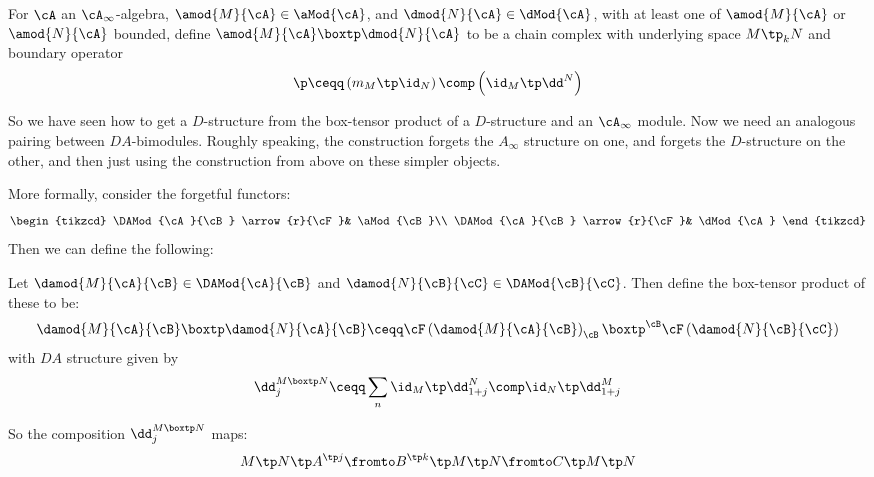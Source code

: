 \documentclass{amsproc}
\begin{document}

\begin{defn}
For $\cA$ an $\cA_\infty$-algebra, $\amod{M}{\cA} \in \aMod{\cA}$, 
and $\dmod{N}{\cA}\in \dMod{\cA}$, with at least one of $\amod{M}{\cA}$ or $\amod{N}{\cA}$
bounded, define $\amod{M}{\cA} \boxtp \dmod{N}{\cA}$ 
to be a chain complex with underlying space
$M\tp_k N$ and boundary operator
\begin{equation}
\p \ceqq \left( m_M \tp \id_N \right)\comp \left( \id_M \tp \dd^N \right)
\end{equation}
\end{defn}

So we have seen how to get a $D$-structure from the box-tensor
product of a $D$-structure and an $\cA_\infty$ module. 
Now we need an analogous pairing between $DA$-bimodules. 
Roughly speaking, the construction forgets the $A_\infty$ structure on one,
and forgets the $D$-structure on the other, and then just using the construction
from above on these simpler objects. 

More formally, consider the forgetful functors:
\begin{equation}
\begin{tikzcd}
\DAMod{\cA}{\cB} \arrow{r}{\cF}& \aMod{\cB}\\
\DAMod{\cA}{\cB} \arrow{r}{\cF}& \dMod{\cA}
\end{tikzcd}
\end{equation}
Then we can define the following:
\begin{defn}
Let $\damod{M}{\cA}{\cB} \in \DAMod{\cA}{\cB}$ and
$\damod{N}{\cB}{\cC}\in \DAMod{\cB}{\cC}$.
Then define the box-tensor product of these to be:
\begin{equation}
\damod{M}{\cA}{\cB} \boxtp \damod{N}{\cA}{\cB} \ceqq
\cF\left( \damod{M}{\cA}{\cB} \right)_\cB \boxtp
^{\cB}\cF\left( \damod{N}{\cB}{\cC} \right)
\end{equation}
with $DA$ structure given by
\begin{equation}
\dd_j^{M\boxtp N} \ceqq
\sum_n
\id_M \tp \dd_{1 + j}^N \comp \id_N \tp \dd_{1 + j}^M
\end{equation}
\end{defn}

So the composition $\dd_j^{M\boxtp N}$ maps:
\begin{equation}
M\tp N \tp A^{\tp j} \fromto B^{\tp k} \tp M \tp N \fromto
C\tp M \tp N
\end{equation}
\end{document}
